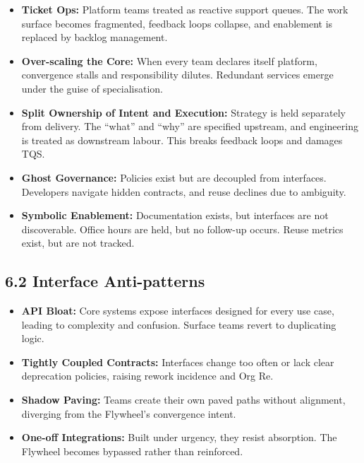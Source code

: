 \documentclass[12pt]{article}
\begin{document}
\begin{antipatternbox}
\begin{itemize}
    \item \textbf{Ticket Ops:} Platform teams treated as reactive support queues. The work surface becomes fragmented, feedback loops collapse, and enablement is replaced by backlog management.
    
    \item \textbf{Over-scaling the Core:} When every team declares itself platform, convergence stalls and responsibility dilutes. Redundant services emerge under the guise of specialisation.
    
    \item \textbf{Split Ownership of Intent and Execution:} Strategy is held separately from delivery. The “what” and “why” are specified upstream, and engineering is treated as downstream labour. This breaks feedback loops and damages TQS.
    
    \item \textbf{Ghost Governance:} Policies exist but are decoupled from interfaces. Developers navigate hidden contracts, and reuse declines due to ambiguity.
    
    \item \textbf{Symbolic Enablement:} Documentation exists, but interfaces are not discoverable. Office hours are held, but no follow-up occurs. Reuse metrics exist, but are not tracked.
\end{itemize}
\end{antipatternbox}

\subsection*{6.2 Interface Anti-patterns}

\begin{antipatternbox}
\begin{itemize}
    \item \textbf{API Bloat:} Core systems expose interfaces designed for every use case, leading to complexity and confusion. Surface teams revert to duplicating logic.
    
    \item \textbf{Tightly Coupled Contracts:} Interfaces change too often or lack clear deprecation policies, raising rework incidence and Org Re.
    
    \item \textbf{Shadow Paving:} Teams create their own paved paths without alignment, \\
    diverging from the Flywheel’s convergence intent.
    
    \item \textbf{One-off Integrations:} Built under urgency, they resist absorption. The Flywheel becomes bypassed rather than reinforced.
\end{itemize}
\end{antipatternbox}
\end{document}
